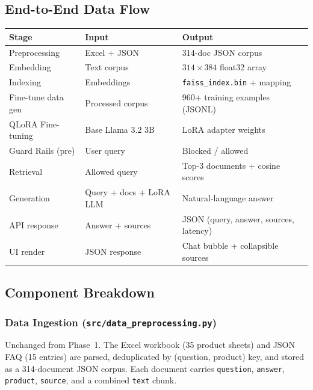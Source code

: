 \documentclass[12pt,a4paper]{article}
\begin{document}
\subsection{End-to-End Data Flow}

\begin{center}
\begin{tabular}{lll}
  \toprule
  Stage & Input & Output \\
  \midrule
  Preprocessing       & Excel + JSON              & 314-doc JSON corpus \\
  Embedding           & Text corpus               & $314 \times 384$ float32 array \\
  Indexing            & Embeddings                & \texttt{faiss\_index.bin} + mapping \\
  Fine-tune data gen  & Processed corpus          & 960+ training examples (JSONL) \\
  QLoRA Fine-tuning   & Base Llama 3.2 3B         & LoRA adapter weights \\
  Guard Rails (pre)   & User query                & Blocked / allowed \\
  Retrieval           & Allowed query             & Top-3 documents + cosine scores \\
  Generation          & Query + docs + LoRA LLM   & Natural-language answer \\
  API response        & Answer + sources          & JSON (query, answer, sources, latency) \\
  UI render           & JSON response             & Chat bubble + collapsible sources \\
  \bottomrule
\end{tabular}
\end{center}

\subsection{Component Breakdown}

\subsubsection{Data Ingestion (\texttt{src/data\_preprocessing.py})}

Unchanged from Phase~1.  The Excel workbook (35 product sheets) and JSON FAQ
(15 entries) are parsed, deduplicated by (question, product) key, and stored as a
314-document JSON corpus.  Each document carries \texttt{question}, \texttt{answer},
\texttt{product}, \texttt{source}, and a combined \texttt{text} chunk.
\end{document}
